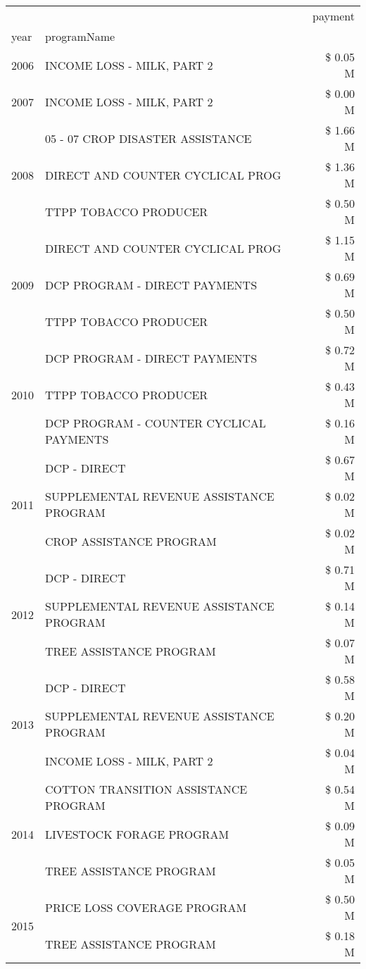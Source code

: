 \begin{tabular}{llr}
\toprule
 &  & payment \\
year & programName &  \\
\midrule
2006 & INCOME LOSS - MILK, PART 2 & \$ 0.05 M \\
\cline{1-3}
2007 & INCOME LOSS - MILK, PART 2 & \$ 0.00 M \\
\cline{1-3}
\multirow[t]{3}{*}{2008} & 05 - 07 CROP DISASTER ASSISTANCE & \$ 1.66 M \\
 & DIRECT AND COUNTER CYCLICAL PROG & \$ 1.36 M \\
 & TTPP TOBACCO PRODUCER & \$ 0.50 M \\
\cline{1-3}
\multirow[t]{3}{*}{2009} & DIRECT AND COUNTER CYCLICAL PROG & \$ 1.15 M \\
 & DCP PROGRAM - DIRECT PAYMENTS & \$ 0.69 M \\
 & TTPP TOBACCO PRODUCER & \$ 0.50 M \\
\cline{1-3}
\multirow[t]{3}{*}{2010} & DCP PROGRAM - DIRECT PAYMENTS & \$ 0.72 M \\
 & TTPP TOBACCO PRODUCER & \$ 0.43 M \\
 & DCP PROGRAM - COUNTER CYCLICAL PAYMENTS & \$ 0.16 M \\
\cline{1-3}
\multirow[t]{3}{*}{2011} & DCP - DIRECT & \$ 0.67 M \\
 & SUPPLEMENTAL REVENUE ASSISTANCE PROGRAM & \$ 0.02 M \\
 & CROP ASSISTANCE PROGRAM & \$ 0.02 M \\
\cline{1-3}
\multirow[t]{3}{*}{2012} & DCP - DIRECT & \$ 0.71 M \\
 & SUPPLEMENTAL REVENUE ASSISTANCE PROGRAM & \$ 0.14 M \\
 & TREE ASSISTANCE PROGRAM & \$ 0.07 M \\
\cline{1-3}
\multirow[t]{3}{*}{2013} & DCP - DIRECT & \$ 0.58 M \\
 & SUPPLEMENTAL REVENUE ASSISTANCE PROGRAM & \$ 0.20 M \\
 & INCOME LOSS - MILK, PART 2 & \$ 0.04 M \\
\cline{1-3}
\multirow[t]{3}{*}{2014} & COTTON TRANSITION ASSISTANCE PROGRAM & \$ 0.54 M \\
 & LIVESTOCK FORAGE PROGRAM & \$ 0.09 M \\
 & TREE ASSISTANCE PROGRAM & \$ 0.05 M \\
\cline{1-3}
\multirow[t]{3}{*}{2015} & PRICE LOSS COVERAGE PROGRAM & \$ 0.50 M \\
 & TREE ASSISTANCE PROGRAM & \$ 0.18 M \\

\end{tabular}
